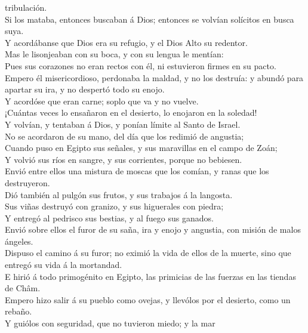 tribulación.\\
 Si los mataba, entonces buscaban á Dios; entonces se
volvían solícitos en busca suya.\\
 Y acordábanse que Dios era su refugio, y el Dios Alto su
redentor.\\
 Mas le lisonjeaban con su boca, y con su lengua le
mentían:\\
 Pues sus corazones no eran rectos con él, ni estuvieron
firmes en su pacto.\\
 Empero él misericordioso, perdonaba la maldad, y no los
destruía: y abundó para apartar su ira, y no despertó todo su enojo.\\
 Y acordóse que eran carne; soplo que va y no vuelve.\\
 ¡Cuántas veces lo ensañaron en el desierto, lo enojaron en
la soledad!\\
 Y volvían, y tentaban á Dios, y ponían límite al Santo de
Israel.\\
 No se acordaron de su mano, del día que los redimió de
angustia;\\
 Cuando puso en Egipto sus señales, y sus maravillas en el
campo de Zoán;\\
 Y volvió sus ríos en sangre, y sus corrientes, porque no
bebiesen.\\
 Envió entre ellos una mistura de moscas que los comían, y
ranas que los destruyeron.\\
 Dió también al pulgón sus frutos, y sus trabajos á la
langosta.\\
 Sus viñas destruyó con granizo, y sus higuerales con
piedra;\\
 Y entregó al pedrisco sus bestias, y al fuego sus
ganados.\\
 Envió sobre ellos el furor de su saña, ira y enojo y
angustia, con misión de malos ángeles.\\
 Dispuso el camino á su furor; no eximió la vida de ellos
de la muerte, sino que entregó su vida á la mortandad.\\
 E hirió á todo primogénito en Egipto, las primicias de las
fuerzas en las tiendas de Châm.\\
 Empero hizo salir á su pueblo como ovejas, y llevólos por
el desierto, como un rebaño.\\
 Y guiólos con seguridad, que no tuvieron miedo; y la mar
